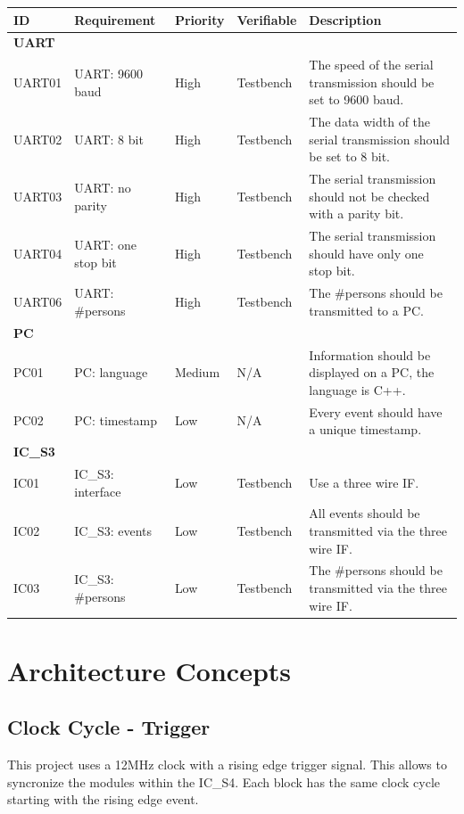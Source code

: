 \documentclass[12pt,a4 paper] {report}
\begin{document}
\begin{center}
	\begin{tabular}{|p{1.5cm}|p{3.5cm}|p{1.5cm}|p{2cm}|p{5.5cm}|}
		\hline
		\textbf{ID} & \textbf{Requirement} & \textbf{Priority} & \textbf{Verifiable} & \textbf{Description} \\
		\hline
		\multicolumn{5}{|l|}{\textbf{UART}} \\
		\hline
		UART01 & UART: 9600 baud & High &  Testbench & The speed of the serial transmission should be set to 9600 baud. \\
		\hline
		UART02 & UART: 8 bit & High & Testbench & The data width of the serial transmission should be set to 8 bit. \\
		\hline
		UART03 & UART: no parity & High & Testbench & The serial transmission should not be checked with a parity bit. \\
		\hline
		UART04 & UART: one stop bit & High  & Testbench & The serial transmission should have only one stop bit. \\
		\hline
		UART06 & UART: \#persons & High &  Testbench &  The \#persons should be transmitted to a PC. \\
		\hline
		\multicolumn{5}{|l|}{\textbf{PC}} \\
		\hline	
		PC01 & PC: language & Medium & N/A &  Information should be displayed on a PC, the language is C++. \\
		\hline
		PC02 & PC: timestamp & Low & N/A  & Every event should have a unique timestamp. \\
		\hline
		\multicolumn{5}{|l|}{\textbf{IC\_S3}} \\
		\hline
		IC01 & IC\_S3: interface & Low & Testbench & Use a three wire IF. \\
		\hline
		IC02 & IC\_S3: events & Low & Testbench & All events should be transmitted via the three wire IF. \\
		\hline
		IC03 & IC\_S3: \#persons & Low  & Testbench & The \#persons should be transmitted via the three wire IF. \\
		\hline
	\end{tabular}
\end{center}

\newpage

\chapter{Architecture Concepts}
\section*{Clock Cycle - Trigger}
This project uses a 12MHz clock with a rising edge trigger signal. This allows to syncronize the modules within the IC\_S4.
Each block has the same clock cycle starting with the rising edge event.
\end{document}
